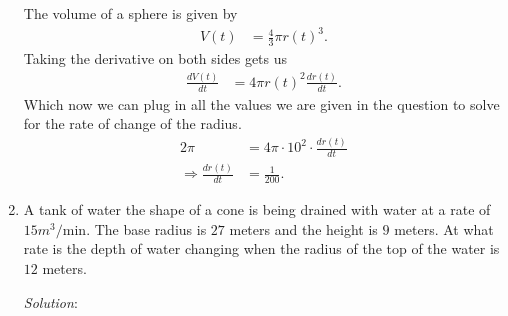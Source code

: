 \documentclass[12pt]{article}
\theoremstyle{remark}
\begin{document}
\begin{enumerate}
\begin{mdframed}[style=TheoremFrame]
The volume of a sphere is given by
\begin{align*}
V(t) &= \frac{4}{3} \pi r(t)^3.
\end{align*}
Taking the derivative on both sides gets us
\begin{align*}
\frac{dV(t)}{dt} &= 4\pi r(t)^2 \frac{dr(t)}{dt}.
\end{align*}
Which now we can plug in all the values we are given in the question to solve for the rate of change of the radius.
\begin{align*}
2\pi &= 4\pi \cdot 10^2 \cdot \frac{dr(t)}{dt}\\
\Rightarrow \frac{dr(t)}{dt} &= \frac{1}{200}.
\end{align*}
\end{mdframed}
\item A tank of water the shape of a cone is being drained with water at a rate of $15m^3/\text{min}$. The base radius is $27$ meters and the height is $9$ meters. At what rate is the depth of water changing when the radius of the top of the water is $12$ meters.
\begin{mdframed}[style=TheoremFrame]
\textit{Solution}:\\


\end{mdframed}
\end{enumerate}
\end{document}
